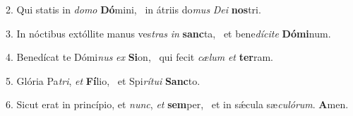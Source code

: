 2. Qui statis in \textit{do}\textit{mo} \textbf{Dó}mini, \ast\  in átriis do\textit{mus} \textit{De}\textit{i} \textbf{nos}tri.\

3. In nóctibus extóllite manus ves\textit{tras} \textit{in} \textbf{sanc}ta, \ast\  et bene\textit{dí}\textit{ci}\textit{te} \textbf{Dó}\textbf{mi}num.\

4. Benedícat te Dómi\textit{nus} \textit{ex} \textbf{Si}on, \ast\  qui fecit \textit{cæ}\textit{lum} \textit{et} \textbf{ter}ram.\

5. Glória Pa\textit{tri}, \textit{et} \textbf{Fí}lio, \ast\  et Spi\textit{rí}\textit{tu}\textit{i} \textbf{Sanc}to.\

6. Sicut erat in princípio, et \textit{nunc}, \textit{et} \textbf{sem}per, \ast\  et in sǽcula sæ\textit{cu}\textit{ló}\textit{rum}. \textbf{A}men.\

